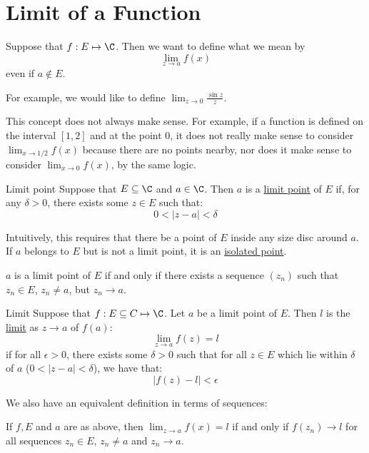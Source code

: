 \documentclass[../Main.tex]{subfiles}
\begin{document}
\section{Limit of a Function}
Suppose that $f : E \mapsto \C$. Then we want to define what we mean by
\begin{equation*}
    \lim_{z \to a} f(x)
\end{equation*}
even if $a \notin E$.\par
For example, we would like to define $\lim_{z \to 0} \frac{\sin{z}}{z}$.\par
This concept does not always make sense. For example, if a function is defined on the interval $[1, 2]$ and at the point $0$, it does not really make sense to consider $\lim_{x \to 1/2}f(x)$ because there are no points nearby, nor does it make sense to consider $\lim_{x \to 0} f(x)$, by the same logic.
\begin{definition}{Limit point}
    Suppose that $E \subseteq \C$ and $a \in \C$. Then $a$ is a \underline{limit point} of $E$ if, for any $\delta > 0$, there exists some $z \in E$ such that:
    \begin{equation*}
        0 < |z - a| < \delta
    \end{equation*}
\end{definition}
Intuitively, this requires that there be a point of $E$ inside any size disc around $a$. If $a$ belongs to $E$ but is not a limit point, it is an \underline{isolated point}.
\begin{remark}
    $a$ is a limit point of $E$ if and only if there exists a sequence $(z_n)$ such that $z_n \in E$, $z_n \neq a$, but $z_n \to a$.
\end{remark}
\begin{definition}{Limit}
    Suppose that $f: E \subseteq C \mapsto \C$. Let $a$ be a limit point of $E$. Then $l$ is the \underline{limit} as $z \to a$ of $f(a)$:
    \begin{equation*}
        \lim_{z \to a} f(z) = l
    \end{equation*}
    if for all $\epsilon > 0$, there exists some $\delta > 0$ such that for all $z \in E$ which lie within $\delta$ of $a$ ($0 < |z - a| < \delta$), we have that:
    \begin{equation*}
        |f(z) - l| < \epsilon
    \end{equation*}
\end{definition}
We also have an equivalent definition in terms of sequences:
\begin{lemma}
    If $f, E$ and $a$ are as above, then $\lim_{z \to a} f(x) = l$ if and only if $f(z_n) \to l$ for all sequences $z_n \in E$, $z_n \neq a$ and $z_n \to a$.
    \label{lemLimitSequenceDef}
\end{lemma}
\end{document}
